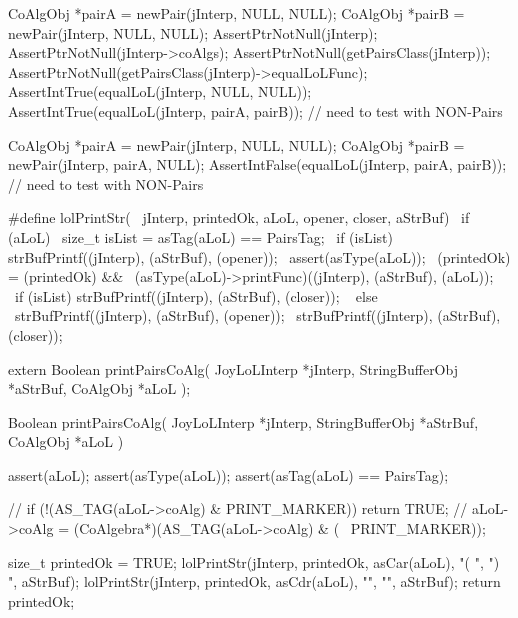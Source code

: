 \startCTest
  CoAlgObj *pairA = newPair(jInterp, NULL, NULL);
  CoAlgObj *pairB = newPair(jInterp, NULL, NULL);
  AssertPtrNotNull(jInterp);
  AssertPtrNotNull(jInterp->coAlgs);
  AssertPtrNotNull(getPairsClass(jInterp));
  AssertPtrNotNull(getPairsClass(jInterp)->equalLoLFunc);
  AssertIntTrue(equalLoL(jInterp, NULL, NULL));
  AssertIntTrue(equalLoL(jInterp, pairA, pairB));
  // need to test with NON-Pairs
\stopCTest
\stopTestCase

\startCTest
  CoAlgObj *pairA = newPair(jInterp, NULL,  NULL);
  CoAlgObj *pairB = newPair(jInterp, pairA, NULL);
  AssertIntFalse(equalLoL(jInterp, pairA, pairB));
  // need to test with NON-Pairs
\stopCTest
\stopTestCase
\stopTestSuite


\startCHeader
#define lolPrintStr(                                           \
  jInterp, printedOk, aLoL, opener, closer, aStrBuf)           \
  if (aLoL) {								                                   \
    size_t isList = asTag(aLoL) == PairsTag;        			     \
    if (isList) strBufPrintf((jInterp), (aStrBuf), (opener));  \
    assert(asType(aLoL));						                           \
    (printedOk) = (printedOk) && 						                   \
      (asType(aLoL)->printFunc)((jInterp), (aStrBuf), (aLoL)); \
    if (isList) strBufPrintf((jInterp), (aStrBuf), (closer));  \
  } else {								                                     \
    strBufPrintf((jInterp), (aStrBuf), (opener));						   \
    strBufPrintf((jInterp), (aStrBuf), (closer));						   \
  }
\stopCHeader

\setCHeaderStream{private}
\startCHeader
extern Boolean printPairsCoAlg(
  JoyLoLInterp    *jInterp,
  StringBufferObj *aStrBuf,
  CoAlgObj        *aLoL
);
\stopCHeader
\setCHeaderStream{public}

\startCCode
Boolean printPairsCoAlg(
  JoyLoLInterp    *jInterp,
  StringBufferObj *aStrBuf,
  CoAlgObj        *aLoL
) {
  assert(aLoL);
  assert(asType(aLoL));
  assert(asTag(aLoL) == PairsTag);

//  if (!(AS_TAG(aLoL->coAlg) & PRINT_MARKER)) return TRUE;
//  aLoL->coAlg = (CoAlgebra*)(AS_TAG(aLoL->coAlg) & (~ PRINT_MARKER));

  size_t printedOk = TRUE;
  lolPrintStr(jInterp, printedOk, asCar(aLoL), "( ", ") ", aStrBuf);
  lolPrintStr(jInterp, printedOk, asCdr(aLoL), "",   "",   aStrBuf);
  return printedOk;
}
\stopCCode

